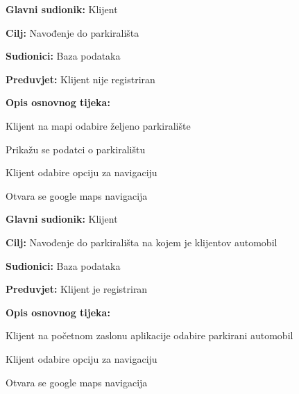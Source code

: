 \noindent {}
\begin{packed_item}
	
	\item \textbf{Glavni sudionik:} Klijent
	\item  \textbf{Cilj:} Navođenje do parkirališta
	\item  \textbf{Sudionici:} Baza podataka
	\item  \textbf{Preduvjet:} Klijent nije registriran
	\item  \textbf{Opis osnovnog tijeka:}
	
	\item[] \begin{packed_enum}
		
		\item Klijent na mapi odabire željeno parkiralište
		\item Prikažu se podatci o parkiralištu
		\item Klijent odabire opciju za navigaciju
		\item Otvara se google maps navigacija
		
	\end{packed_enum}
\end{packed_item}

\noindent {}
\begin{packed_item}
	
	\item \textbf{Glavni sudionik:} Klijent
	\item  \textbf{Cilj:} Navođenje do parkirališta na kojem je klijentov automobil
	\item  \textbf{Sudionici:} Baza podataka
	\item  \textbf{Preduvjet:} Klijent je registriran
	\item  \textbf{Opis osnovnog tijeka:}
	
	\item[] \begin{packed_enum}
		
		\item Klijent na početnom zaslonu aplikacije odabire parkirani automobil
		\item Klijent odabire opciju za navigaciju
		\item Otvara se google maps navigacija
		
	\end{packed_enum}
\end{packed_item}
